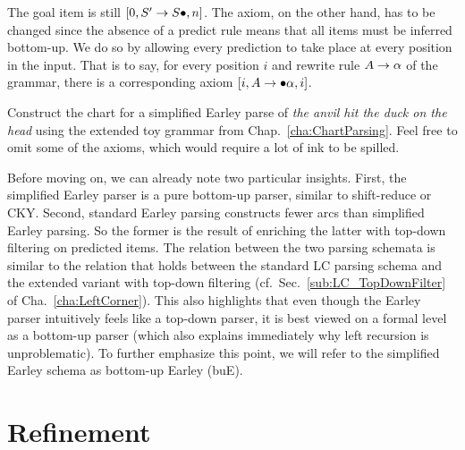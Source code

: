 \begin{prooftree}
\end{prooftree}
%
\begin{prooftree}
\end{prooftree}
%
The goal item is still $[0, S' \rewrite S \psep, n]$.
The axiom, on the other hand, has to be changed since the absence of a predict rule means that all items must be inferred bottom-up.
We do so by allowing every prediction to take place at every position in the input.
That is to say, for every position $i$ and rewrite rule $A \rewrite \alpha$ of the grammar, there is a corresponding axiom $[i, A \rewrite \psep \alpha, i]$.
%
\begin{exercise}
    Construct the chart for a simplified Earley parse of \emph{the anvil hit the duck on the head} using the extended toy grammar from Chap.~\ref{cha:ChartParsing}.
    Feel free to omit some of the axioms, which would require a lot of ink to be spilled.
\end{exercise}
%
Before moving on, we can already note two particular insights.
First, the simplified Earley parser is a pure bottom-up parser, similar to shift-reduce or CKY\@.
Second, standard Earley parsing constructs fewer arcs than simplified Earley parsing.
So the former is the result of enriching the latter with top-down filtering on predicted items.
The relation between the two parsing schemata is similar to the relation that holds between the standard LC parsing schema and the extended variant with top-down filtering (cf.\ Sec.~\ref{sub:LC_TopDownFilter} of Cha.~\ref{cha:LeftCorner}).
This also highlights that even though the Earley parser intuitively feels like a top-down parser, it is best viewed on a formal level as a bottom-up parser (which also explains immediately why left recursion is unproblematic).
To further emphasize this point, we will refer to the simplified Earley schema as bottom-up Earley (buE).


\section{Refinement}

